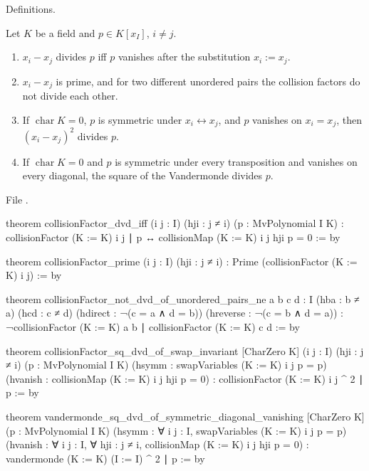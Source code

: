 \begin{status}
Definitions.
\end{status}

\begin{theorem}\label{l20:thm:collision}
Let $K$ be a field and $p\in K[x_I]$, $i\ne j$.
\begin{enumerate}
\item $x_i-x_j$ divides $p$ iff $p$ vanishes after the substitution $x_i:=x_j$.
\item $x_i-x_j$ is prime, and for two different unordered pairs the collision factors do not divide each other.
\item If $\operatorname{char}K=0$, $p$ is symmetric under $x_i\leftrightarrow x_j$, and $p$ vanishes on $x_i=x_j$, then $(x_i-x_j)^2$
  divides $p$.
\item If $\operatorname{char}K=0$ and $p$ is symmetric under every transposition and vanishes on every diagonal, the square of the
  Vandermonde divides $p$.
\end{enumerate}
\end{theorem}
\noindent File .
\begin{leancode}
theorem collisionFactor_dvd_iff (i j : I) (hji : j ≠ i)
    (p : MvPolynomial I K) :
    collisionFactor (K := K) i j ∣ p ↔ collisionMap (K := K) i j hji p = 0 := by

theorem collisionFactor_prime (i j : I) (hji : j ≠ i) :
    Prime (collisionFactor (K := K) i j) := by

theorem collisionFactor_not_dvd_of_unordered_pairs_ne
    {a b c d : I} (hba : b ≠ a) (hcd : c ≠ d)
    (hdirect : ¬(c = a ∧ d = b)) (hreverse : ¬(c = b ∧ d = a)) :
    ¬collisionFactor (K := K) a b ∣ collisionFactor (K := K) c d := by

theorem collisionFactor_sq_dvd_of_swap_invariant [CharZero K]
    (i j : I) (hji : j ≠ i)
    (p : MvPolynomial I K)
    (hsymm : swapVariables (K := K) i j p = p)
    (hvanish : collisionMap (K := K) i j hji p = 0) :
    collisionFactor (K := K) i j ^ 2 ∣ p := by

theorem vandermonde_sq_dvd_of_symmetric_diagonal_vanishing [CharZero K]
    (p : MvPolynomial I K)
    (hsymm : ∀ i j : I, swapVariables (K := K) i j p = p)
    (hvanish : ∀ i j : I, ∀ hji : j ≠ i,
      collisionMap (K := K) i j hji p = 0) :
    vandermonde (K := K) (I := I) ^ 2 ∣ p := by
\end{leancode}

